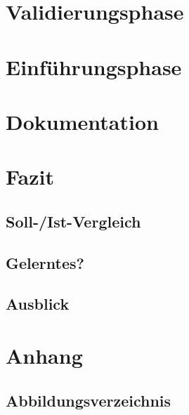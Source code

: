 \documentclass{article}
\begin{document}
%
\section{Validierungsphase}

\section{Einführungsphase}


\section{Dokumentation}

\section{Fazit}
\subsection{Soll-/Ist-Vergleich}
\subsection{Gelerntes?}
\subsection{Ausblick}


\section{Anhang}

\subsection{Abbildungsverzeichnis}
\end{document}
